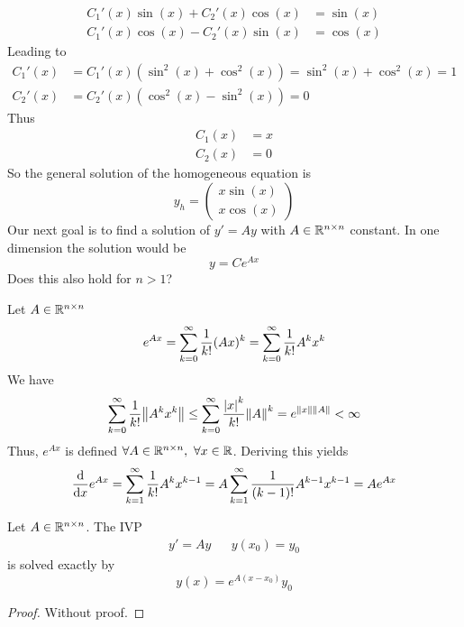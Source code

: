 \documentclass[../../script.tex]{subfiles}
\begin{document}
\begin{eg}
\begin{align*}
        C_1'(x)\sin(x) + C_2'(x)\cos(x) &= \sin(x) \\
        C_1'(x)\cos(x) - C_2'(x)\sin(x) &= \cos(x)
    \end{align*}
    Leading to 
    \begin{align*}
        C_1'(x) &= C_1'(x)(\sin^2(x) + \cos^2(x)) = \sin^2(x) + \cos^2(x) = 1 \\
        C_2'(x) &= C_2'(x)(\cos^2(x) - \sin^2(x)) = 0
    \end{align*}
    Thus 
    \begin{align*}
        C_1(x) &= x \\
        C_2(x) &= 0
    \end{align*}
    So the general solution of the homogeneous equation is 
    \[
        y_h = \begin{pmatrix}
            x \sin(x) \\ x \cos(x)
        \end{pmatrix}
    \]
    Our next goal is to find a solution of $y' = Ay$ with $A \in \mathbb{R}^{n \times n}$ constant.
    In one dimension the solution would be 
    \[
        y = Ce^{Ax}
    \]
    Does this also hold for $n > 1$?
\end{eg}

\begin{rem}
    Let $A \in \mathbb{R}^{n \times n}$
    \[
        e^{Ax} = \sum_{k=0}^{\infty} \frac{1}{k!}(Ax)^k = \sum_{k=0}^{\infty} \frac{1}{k!} A^k x^k 
    \]
    We have 
    \[
        \sum_{k=0}^{\infty} \frac{1}{k!} \norm{A^k x^k} \le \sum_{k=0}^{\infty} \frac{\abs{x}^k}{k!} \norm{A}^k = e^{\norm{x}\norm{A}} < \infty
    \]
    Thus, $e^{Ax}$ is defined $\forall A \in \mathbb{R}^{n \times n}, ~\forall x \in \mathbb{R}$. Deriving this yields 
    \[
        \dv{x}e^{Ax} = \sum_{k=1}^{\infty} \frac{1}{k!} A^k x^{k-1} = A \sum_{k=1}^{\infty} \frac{1}{(k-1)!} A^{k-1} x^{k-1} = Ae^{Ax}
    \]
\end{rem}

\begin{thm}
    Let $A \in \mathbb{R}^{n \times n}$. The IVP 
    \begin{align*}
        y' = Ay && y(x_0) = y_0
    \end{align*}
    is solved exactly by 
    \[
        y(x) = e^{A(x - x_0)}y_0
    \]
\end{thm}
\begin{proof}
    Without proof.
\end{proof}
\end{document}
